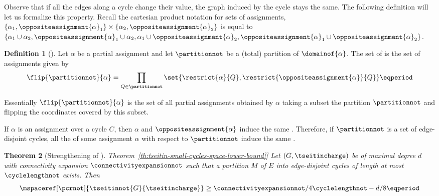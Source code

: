 \documentclass[11pt]{article}
\numberwithin{equation}{section}
\newtheorem{theorem}{Theorem}[section]
\theoremstyle{definition}
\newtheorem{definition}[theorem]{Definition}
\theoremstyle{plain}
\newcommand{\expref}[2]{\hyperref[#2]{#1~\ref{#2}}}
\begin{document}
Observe that if all the edges along a cycle change their value, the
graph induced by the cycle stays the same. The following definition
will let us formalize this property. Recall the cartesian product
notation for sets of assignments, \egComma
%
$\{\alpha_{1}, \oppositeassignment{\alpha}_{1}\}
\times
\{\alpha_{2}, \oppositeassignment{\alpha}_{2}\}$ is equal to
%
$\{\alpha_{1} \cup \alpha_{2}, \oppositeassignment{\alpha}_{1} \cup
\alpha_{2}, \alpha_{1} \cup \oppositeassignment{\alpha}_{2},
\oppositeassignment{\alpha}_{1} \cup \oppositeassignment{\alpha}_{2}
\}$.


\begin{definition}[\Flippedassignments]
  \label{def:flippedassignments}
  Let $\alpha$ be a partial assignment and let $\partitionnot$ be a (total) partition of $\domainof{\alpha}$. The set of  is the set of assignments given by
  \begin{equation*}
    \flip{\partitionnot}{\alpha}=\prod_{Q\in\partitionnot}\set{\restrict{\alpha}{Q},\restrict{\oppositeassignment{\alpha}}{Q}} \eqperiod
  \end{equation*}
\end{definition}

Essentially $\flip{\partitionnot}{\alpha}$ is the set of all partial
assignments obtained by $\alpha$ taking a subset the partition
$\partitionnot$ and flipping the coordinates covered by this subset.

\begin{observation}
  \label{obs:flipping-respects-induced}
  If $\alpha$ is an assignment over a cycle $C$, then $\alpha$ and $\oppositeassignment{\alpha}$ induce the same \chargedgraph. Therefore, if $\partitionnot$ is a set of edge-disjoint cycles, all the \flippedassignments of some assignment $\alpha$ with respect to $\partitionnot$ induce the same \chargedgraph.
\end{observation}

\begin{theorem}[Strengthening of \expref{Theorem}{th:tseitin-small-cycles-space-lower-bound}]
  \label{th:tseitin-small-cycles-space-lower-bound-strengthened}
  Let $(G,\tseitincharge)$ be \Gnonsplitting \chargedgraph of maximal degree $d$ with connectivity expansion $\connectivityexpansionnot$ such that a partition $M$ of $E$ into edge-disjoint cycles of length at most $\cyclelengthnot$ exists. Then
  \begin{equation*}
    \mspaceref[\pcrnot]{\tseitinnot{G}{\tseitincharge}}\geq \connectivityexpansionnot/4\cyclelengthnot -d/8 \eqperiod
  \end{equation*}
\end{theorem}
\end{document}
